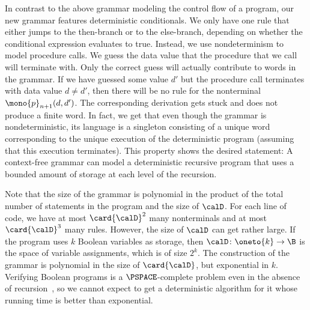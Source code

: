 \documentclass[../../diss.tex]{subfiles}
\begin{document}
In contrast to the above grammar modeling the control flow of a program, our new grammar features deterministic conditionals.
We only have one rule that either jumps to the then-branch or to the else-branch, depending on whether the conditional expression evaluates to true.
Instead, we use nondeterminism to model procedure calls.
We guess the data value that the procedure that we call will terminate with.
Only the correct guess will actually contribute to words in the grammar.
If we have guessed some value $d'$ but the procedure call terminates with data value $d \neq d'$, then there will be no rule for the nonterminal $\mono{p}_{n+1}(d,d')$.
The corresponding derivation gets stuck and does not produce a finite word.
In fact, we get that even though the grammar is nondeterministic, its language is a singleton consisting of a unique word corresponding to the unique execution of the deterministic program (assuming that this execution terminates).
This property shows the desired statement: A context-free grammar can model a deterministic recursive program that uses a bounded amount of storage at each level of the recursion.

Note that the size of the grammar is polynomial in the product of the total number of statements in the program and the size of $\domain$.
For each line of code, we have at most ${\card{\domain}}^2$ many nonterminals and at most ${\card{\domain}}^3$ many rules.
However, the size of $\domain$ can get rather large.
If the program uses $k$ Boolean variables as storage, then $\domain \colon \oneto{k} \to \B$ is the space of variable assignments, which is of size $2^{k}$.
The construction of the grammar is polynomial in the size of $\card{\domain}$, but exponential in $k$.
Verifying Boolean programs is a $\PSPACE$-complete problem even in the absence of recursion~\cite{CookS99}, so we cannot expect to get a deterministic algorithm for it whose running time is better than exponential.
\end{document}
